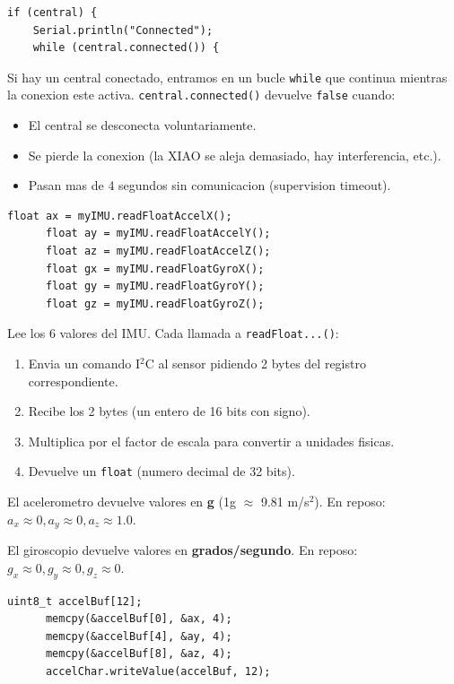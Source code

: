 \documentclass[11pt,a4paper]{article}
\begin{document}
\begin{lstlisting}[style=arduino]
  if (central) {
    Serial.println("Connected");
    while (central.connected()) {
\end{lstlisting}

Si hay un central conectado, entramos en un bucle \texttt{while}
que continua mientras la conexion este activa.
\texttt{central.connected()} devuelve \texttt{false} cuando:
\begin{itemize}
    \item El central se desconecta voluntariamente.
    \item Se pierde la conexion (la XIAO se aleja demasiado, hay
          interferencia, etc.).
    \item Pasan mas de 4 segundos sin comunicacion (supervision
          timeout).
\end{itemize}

\begin{lstlisting}[style=arduino]
      float ax = myIMU.readFloatAccelX();
      float ay = myIMU.readFloatAccelY();
      float az = myIMU.readFloatAccelZ();
      float gx = myIMU.readFloatGyroX();
      float gy = myIMU.readFloatGyroY();
      float gz = myIMU.readFloatGyroZ();
\end{lstlisting}

Lee los 6 valores del IMU. Cada llamada a \texttt{readFloat...()}:
\begin{enumerate}
    \item Envia un comando I$^2$C al sensor pidiendo 2 bytes del
          registro correspondiente.
    \item Recibe los 2 bytes (un entero de 16 bits con signo).
    \item Multiplica por el factor de escala para convertir a
          unidades fisicas.
    \item Devuelve un \texttt{float} (numero decimal de 32 bits).
\end{enumerate}

El acelerometro devuelve valores en \textbf{g} (1g $\approx$
9.81 m/s$^2$). En reposo: $a_x \approx 0, a_y \approx 0,
a_z \approx 1.0$.

El giroscopio devuelve valores en \textbf{grados/segundo}. En
reposo: $g_x \approx 0, g_y \approx 0, g_z \approx 0$.

\begin{lstlisting}[style=arduino]
      uint8_t accelBuf[12];
      memcpy(&accelBuf[0], &ax, 4);
      memcpy(&accelBuf[4], &ay, 4);
      memcpy(&accelBuf[8], &az, 4);
      accelChar.writeValue(accelBuf, 12);
\end{lstlisting}
\end{document}
